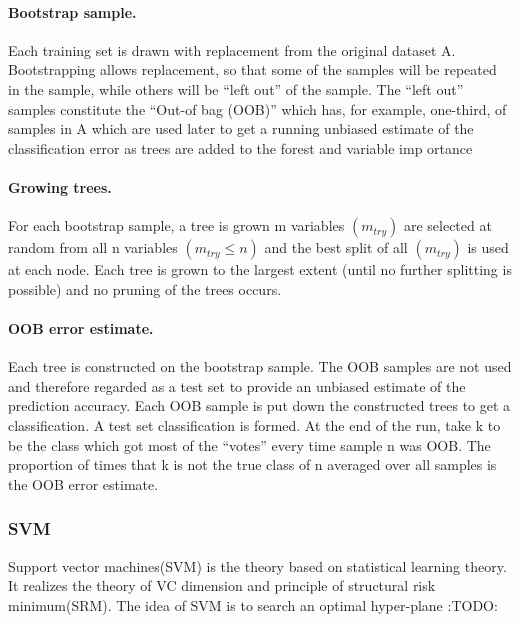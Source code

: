 \documentclass[]{article}
\begin{document}
\paragraph{Bootstrap sample.}\label{bootstrap-sample.}

Each training set is drawn with replacement from the original dataset A.
Bootstrapping allows replacement, so that some of the samples will be
repeated in the sample, while others will be ``left out'' of the sample.
The ``left out'' samples constitute the ``Out-of bag (OOB)'' which has,
for example, one-third, of samples in A which are used later to get a
running unbiased estimate of the classification error as trees are added
to the forest and variable imp ortance

\paragraph{Growing trees.}\label{growing-trees.}

For each bootstrap sample, a tree is grown m variables $(m_{try})$ are
selected at random from all n variables $(m_{try} \leq n)$ and the best
split of all $(m_{try})$ is used at each node. Each tree is grown to the
largest extent (until no further splitting is possible) and no pruning
of the trees occurs.

\paragraph{OOB error estimate.}\label{oob-error-estimate.}

Each tree is constructed on the bootstrap sample. The OOB samples are
not used and therefore regarded as a test set to provide an unbiased
estimate of the prediction accuracy. Each OOB sample is put down the
constructed trees to get a classification. A test set classification is
formed. At the end of the run, take k to be the class which got most of
the ``votes'' every time sample n was OOB. The proportion of times that
k is not the true class of n averaged over all samples is the OOB error
estimate.

\subsubsection{SVM}\label{svm}

Support vector machines(SVM) is the theory based on statistical learning
theory. It realizes the theory of VC dimension and principle of
structural risk minimum(SRM). The idea of SVM is to search an optimal
hyper-plane :TODO:
\end{document}
